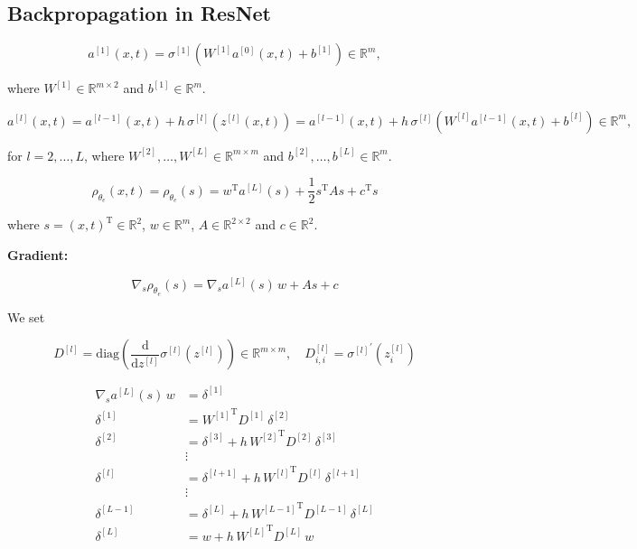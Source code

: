 \subsection{Backpropagation in ResNet}

\begin{equation*}
    a^{[1]}(x,t) = \sigma^{[1]} (W^{[1]} a^{[0]}(x,t) + b^{[1]}) \in \mathbb{R}^{m}, 
\end{equation*}

where $W^{[1]} \in \mathbb{R}^{m \times 2}$ and $b^{[1]} \in \mathbb{R}^{m}$.

\begin{equation*}
    a^{[l]}(x,t) = a^{[l-1]}(x,t) + h \, \sigma^{[l]} (z^{[l]}(x,t)) = a^{[l-1]}(x,t) + h \, \sigma^{[l]} (W^{[l]} a^{[l-1]}(x,t) + b^{[l]}) \in \mathbb{R}^{m}, 
\end{equation*}

for $l = 2, \ldots, L$, where $W^{[2]}, \ldots, W^{[L]} \in \mathbb{R}^{m \times m}$ and $b^{[2]}, \ldots, b^{[L]} \in \mathbb{R}^{m}$.

\begin{equation*}
    \rho_{\theta_e}(x, t) = \rho_{\theta_e}(s) = w^{\mathrm{T}} a^{[L]}(s) + \frac{1}{2} s^{\mathrm{T}} A s + c^{\mathrm{T}} s 
\end{equation*}

where $s = (x, t)^{\mathrm{T}} \in \mathbb{R}^{2}$, $w \in \mathbb{R}^{m}$, $A \in \mathbb{R}^{2 \times 2}$ and $c \in \mathbb{R}^2$.

\textbf{Gradient:}

\begin{equation*}
    \nabla_s \rho_{\theta_e}(s) = \nabla_s a^{[L]}(s) \, w + A s + c
\end{equation*}

We set

\begin{equation*}
    D^{[l]} = \mathrm{diag} \left( \frac{\mathrm{d}}{\mathrm{d}z^{[l]}} \sigma^{[l]} (z^{[l]}) \right) \in \mathbb{R}^{m \times m}, \quad D_{i, i}^{[l]} = {\sigma^{[l]}}^{\prime} (z_{i}^{[l]})
\end{equation*}

\begin{align*}
    \nabla_s a^{[L]}(s) \, w & = \delta^{[1]}  \\
    \delta^{[1]} & = {W^{[1]}}^{\mathrm{T}} D^{[1]} \, \delta^{[2]} \\
    \delta^{[2]} & = \delta^{[3]} + h \, {W^{[2]}}^{\mathrm{T}} D^{[2]} \, \delta^{[3]} \\
    &\vdots\\
    \delta^{[l]} & = \delta^{[l+1]} + h \, {W^{[l]}}^{\mathrm{T}} D^{[l]} \, \delta^{[l+1]} \\
    &\vdots\\
    \delta^{[L-1]} & = \delta^{[L]} + h \, {W^{[L-1]}}^{\mathrm{T}} D^{[L-1]} \, \delta^{[L]} \\
    \delta^{[L]} & = w + h \, {W^{[L]}}^{\mathrm{T}} D^{[L]} \, w
\end{align*}


